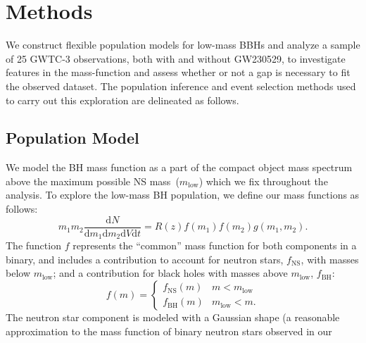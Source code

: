 \documentclass[modern]{aastex631}
\newcommand{\dd}{\ensuremath{\mathrm{d}}}
\begin{document}
\section{Methods}
\label{sec:methods}
\noindent
We construct flexible population models for low-mass BBHs and analyze a sample of 25 GWTC-3 observations, both with and without GW230529, to investigate features in the mass-function and assess whether or not a gap is necessary to fit the observed dataset. The population inference and event selection methods used to carry out this exploration are delineated as follows.
\subsection{Population Model}
\noindent
{}  We model the BH mass function as a part of the
compact object mass spectrum above the maximum possible NS
mass~($m_\mathrm{low}$) which we fix throughout the analysis. To explore the
low-mass BH population, we define our mass functions as follows:
\begin{equation}
    \label{eq:intensity-definition}
    m_1 m_2 \frac{\dd N}{\dd m_1 \dd m_2 \dd V \dd t} = R(z) f\left( m_1 \right) f\left( m_2 \right) g(m_1, m_2).
\end{equation}
\noindent
The function $f$ represents the ``common'' mass function for both components in
a binary, and includes a contribution to account for neutron stars,
$f_\mathrm{NS}$, with masses below $m_\mathrm{low}$; and a contribution for
black holes with masses above $m_\mathrm{low}$, $f_\mathrm{BH}$:
\begin{equation}
    f(m) = \begin{cases}
        f_\mathrm{NS}(m) & m < m_\mathrm{low} \\
        f_\mathrm{BH}(m) & m_\mathrm{low} < m.
    \end{cases}
\end{equation}
The neutron star component is modeled with a Gaussian shape (a reasonable
approximation to the mass function of binary neutron stars observed in our
\end{document}
